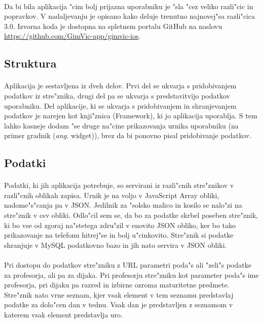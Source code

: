 \paragraph{}Da bi bila aplikacija "cim bolj prijazna uporabniku je "sla "cez veliko razli"cic in popravkov. V nadaljevanju je opisano kako deluje trenutno najnovej"sa razli"cica 3.0. Izvorna koda je dostopna na spletnem portalu GitHub na naslovu \url{https://github.com/GimVic-app/gimvic-ios}.

\subsection{Struktura}
\paragraph{}
Aplikacija je sestavljena iz dveh delov. Prvi del se ukvarja s pridobivanjem podatkov iz stre"znika, drugi del pa se ukvarja s predstavitvijo podatkov uporabniku. Del aplikacije, ki se ukvarja s pridobivanjem in shranjevanjem podatkov je narejen kot knji"znica (Framework), ki jo aplikacija uporablja. S tem lahko kasneje dodam "se druge na"cine prikazovanja urnika uporabniku (na primer gradnik (\textit{ang.} widget)), brez da bi ponovno pisal pridobivanje podatkov.

\subsection{Podatki} 
\paragraph{}Podatki, ki jih aplikacija potrebuje, so servirani iz razli"cnih stre"znikov v razli"cnih oblikah zapisa. Urnik je na voljo v JavaScript Array\cite{js-array} obliki, nadome"s"canja pa v JSON\cite{json-wiki}. Jedilnik za "solsko malico in kosilo se nalo"zi na stre"znik v csv\cite{csv-wiki} obliki. Odlo"cil sem se, da bo za podatke skrbel poseben stre"znik, ki bo vse od zgoraj na"stetega zdru"zil v enovito JSON obliko, ker bo tako prikazovanje na telefonu hitrej"se in bolj u"cinkovito. Stre"znik si podatke shranjuje v MySQL\cite{mysql-wiki} podatkovno bazo\cite{rin} in jih nato servira v JSON obliki.

\paragraph{}Pri dostopu do podatkov stre"zniku z URL parametri\cite{query-string-wiki} poda"s ali "zeli"s podatke za profesorja, ali pa za dijaka. Pri profesorju stre"zniku kot parameter poda"s ime profesorja, pri dijaku pa razred in izbirne ozroma maturitetne predmete. Stre"znik nato vrne seznam, kjer vsak element v tem seznamu predstavlaj podatke za dolo"cen dan v tednu. Vsak dan je predstavljen z seznamom v katerem vsak element predstavlja uro.

